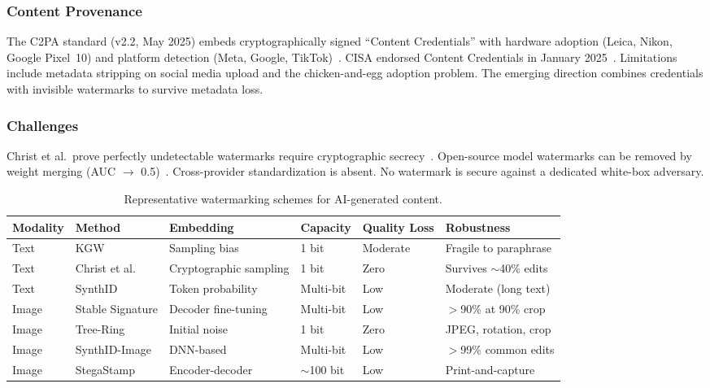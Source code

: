 \subsubsection{Content Provenance}
\label{sec:provenance}

The C2PA standard (v2.2, May 2025) embeds cryptographically signed ``Content Credentials'' with hardware adoption (Leica, Nikon, Google Pixel~10) and platform detection (Meta, Google, TikTok)~\cite{c2pa2025}. CISA endorsed Content Credentials in January 2025~\cite{cisa2025cc}. Limitations include metadata stripping on social media upload and the chicken-and-egg adoption problem. The emerging direction combines credentials with invisible watermarks to survive metadata loss.

\subsubsection{Challenges}
\label{sec:wm-challenges}

Christ et al.\ prove perfectly undetectable watermarks require cryptographic secrecy~\cite{christ2024undetectable}. Open-source model watermarks can be removed by weight merging (AUC $\to$ 0.5)~\cite{xu2025removal}. Cross-provider standardization is absent. No watermark is secure against a dedicated white-box adversary.

\begin{table}[htbp]
\centering
\caption{Representative watermarking schemes for AI-generated content.}
\label{tab:watermark}
\small
\begin{tabular}{p{1.2cm}p{2.2cm}p{2.0cm}p{1.5cm}p{1.5cm}p{3.5cm}}
\toprule
\textbf{Modality} & \textbf{Method} & \textbf{Embedding} & \textbf{Capacity} & \textbf{Quality Loss} & \textbf{Robustness} \\
\midrule
Text & KGW & Sampling bias & 1 bit & Moderate & Fragile to paraphrase \\
\addlinespace
Text & Christ et al. & Cryptographic sampling & 1 bit & Zero & Survives $\sim$40\% edits \\
\addlinespace
Text & SynthID & Token probability & Multi-bit & Low & Moderate (long text) \\
\addlinespace
Image & Stable Signature & Decoder fine-tuning & Multi-bit & Low & $>$90\% at 90\% crop \\
\addlinespace
Image & Tree-Ring & Initial noise & 1 bit & Zero & JPEG, rotation, crop \\
\addlinespace
Image & SynthID-Image & DNN-based & Multi-bit & Low & $>$99\% common edits \\
\addlinespace
Image & StegaStamp & Encoder-decoder & $\sim$100 bit & Low & Print-and-capture \\
\bottomrule
\end{tabular}
\end{table}


